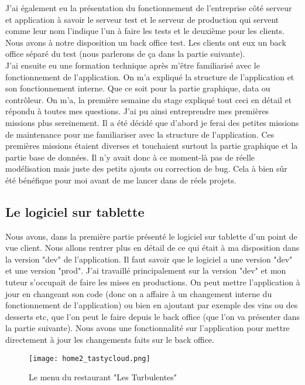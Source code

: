 J'ai également eu la présentation du fonctionnement de l'entreprise côté serveur et application à savoir le serveur test et le serveur de production qui servent comme leur nom l'indique l'un à faire les tests et le deuxième pour les clients. Nous avons à notre disposition un back office test. Les clients ont eux un back office séparé du test (nous parlerons de ça dans la partie suivante).\\

J'ai ensuite eu une formation technique après m'être familiarisé avec le fonctionnement de l'application. On m'a expliqué la structure de l'application et son fonctionnement interne. Que ce soit pour la partie graphique, data ou contrôleur. On m'a, la première semaine du stage expliqué tout ceci en détail et répondu à toutes mes questions. J'ai pu ainsi entreprendre mes premières missions plus sereinement. Il a été décidé que d'abord je ferai des petites missions de maintenance pour me familiariser avec la structure de l'application. Ces premières missions étaient diverses et touchaient surtout la partie graphique et la partie base de données. Il n'y avait donc à ce moment-là pas de réelle modélisation mais juste des petits ajouts ou correction de bug. Cela à bien sûr été bénéfique pour moi avant de me lancer dans de réels projets.

\clearpage

\subsection{Le logiciel sur tablette}

Nous avons, dans la première partie présenté le logiciel sur tablette d'un point de vue client. Nous allons rentrer plus en détail de ce qui était à ma disposition dans la version "dev" de l'application. Il faut savoir que le logiciel a une version "dev" et une version "prod". J'ai travaillé principalement sur la version "dev" et mon tuteur s'occupait de faire les mises en productions. On peut mettre l'application à jour en changeant son code (donc on a affaire à un changement interne du fonctionnement de l'application) ou bien en ajoutant par exemple des vins ou des desserts etc, que l'on peut le faire depuis le back office (que l'on va présenter dans la partie suivante). Nous avons une fonctionnalité sur l'application pour mettre directement à jour les changements faits sur le back office.\\

\begin{figure}[!htb]
  \centering
  \texttt{[image: home2\_tastycloud.png]}
  \caption{Le menu du restaurant "Les Turbulentes"}
  \label{fig:boat1}
\end{figure}

